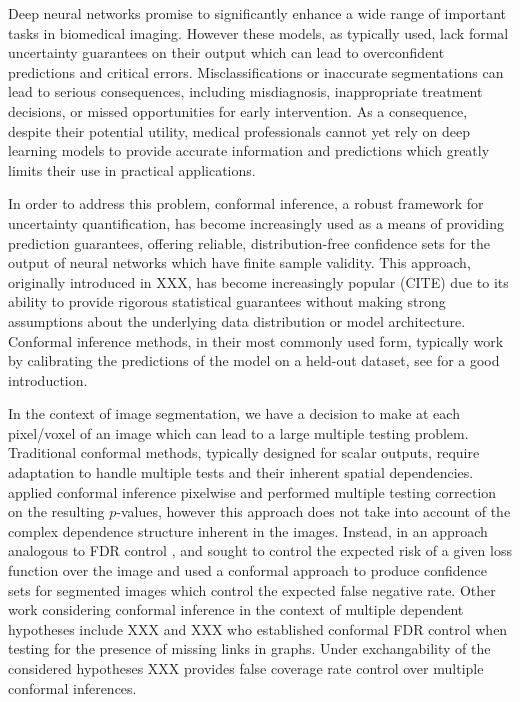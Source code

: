 


Deep neural networks promise to significantly enhance a wide range of important tasks in biomedical imaging. However these models, as typically used, lack formal uncertainty guarantees on their output which can lead to overconfident predictions and critical errors. Misclassifications or inaccurate segmentations can lead to serious consequences, including misdiagnosis, inappropriate treatment decisions, or missed opportunities for early intervention.  As a consequence, despite their potential utility, medical professionals cannot yet rely on deep learning models to provide accurate information and predictions which greatly limits their use in practical applications. 

In order to address this problem, conformal inference, a robust framework for uncertainty quantification, has become increasingly used as a means of providing prediction guarantees, offering reliable, distribution-free confidence sets for the output of neural networks which have finite sample validity. This approach, originally introduced in XXX, has become increasingly popular (CITE) due to its ability to provide rigorous statistical guarantees without making strong assumptions about the underlying data distribution or model architecture. Conformal inference methods, in their most commonly used form, typically work by calibrating the predictions of the model on a held-out dataset, see \cite{Angelopoulos2021} for a good introduction.

In the context of image segmentation, we have a decision to make at each pixel/voxel of an image which can lead to a large multiple testing problem. Traditional conformal methods, typically designed for scalar outputs, require adaptation to handle multiple tests and their inherent spatial dependencies. \cite{Angelopoulos2021LTT} applied conformal inference pixelwise and performed multiple testing correction on the resulting $p$-values, however this approach does not take into account of the complex dependence structure inherent in the images. Instead, in an approach analogous to FDR control \citep{Benjamini1995}, \cite{Bates2021} and \cite{Angelopoulos2022} sought to control the expected risk of a given loss function over the image and used a conformal approach to produce confidence sets for segmented images which control the expected false negative rate. Other work considering conformal inference in the context of multiple dependent hypotheses include XXX and XXX who established conformal FDR control when testing for the presence of missing links in graphs. Under exchangability of the considered hypotheses XXX provides false coverage rate control over multiple conformal inferences.

